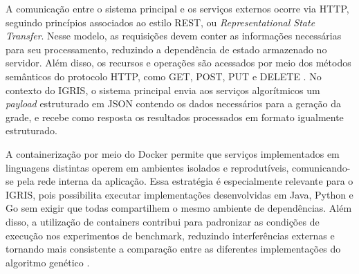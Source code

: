 A comunicação entre o sistema principal e os serviços externos ocorre via HTTP, seguindo princípios associados ao estilo REST, ou \textit{Representational State Transfer}. Nesse modelo, as requisições devem conter as informações necessárias para seu processamento, reduzindo a dependência de estado armazenado no servidor. Além disso, os recursos e operações são acessados por meio dos métodos semânticos do protocolo HTTP, como GET, POST, PUT e DELETE \cite[p.~3]{newman2021}. No contexto do IGRIS, o sistema principal envia aos serviços algorítmicos um \textit{payload} estruturado em JSON contendo os dados necessários para a geração da grade, e recebe como resposta os resultados processados em formato igualmente estruturado.

A containerização por meio do Docker permite que serviços implementados em linguagens distintas operem em ambientes isolados e reprodutíveis, comunicando-se pela rede interna da aplicação. Essa estratégia é especialmente relevante para o IGRIS, pois possibilita executar implementações desenvolvidas em Java, Python e Go sem exigir que todas compartilhem o mesmo ambiente de dependências. Além disso, a utilização de containers contribui para padronizar as condições de execução nos experimentos de benchmark, reduzindo interferências externas e tornando mais consistente a comparação entre as diferentes implementações do algoritmo genético \cite[p.~20]{newman2021}.
